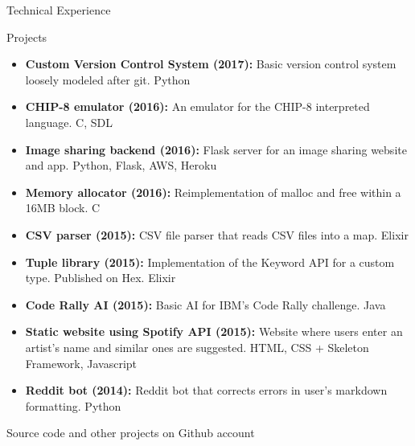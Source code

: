 \documentclass[]{mcdowellcv}
\begin{document}
	\begin{cvsection}{Technical Experience}
		\begin{cvsubsection}{Projects}{}{}
			\begin{itemize}
				\item \textbf{Custom Version Control System (2017):} Basic version control system loosely modeled after git. Python
                \item \textbf{CHIP-8 emulator (2016):} An emulator for the CHIP-8 interpreted language.  C, SDL
                \item \textbf{Image sharing backend (2016):} Flask server for an image sharing website and app.  Python, Flask, AWS, Heroku
				\item \textbf{Memory allocator (2016):} Reimplementation of malloc and free within a 16MB block.  C
				\item \textbf{CSV parser (2015):} CSV file parser that reads CSV files into a map.  Elixir
				\item \textbf{Tuple library (2015):} Implementation of the Keyword API for a custom type. Published on Hex.  Elixir
				\item \textbf{Code Rally AI (2015):} Basic AI for IBM's Code Rally challenge.  Java
				\item \textbf{Static website using Spotify API (2015):} Website where users enter an artist's name and similar ones are suggested.  HTML, CSS + Skeleton Framework, Javascript
				\item \textbf{Reddit bot (2014):} Reddit bot that corrects errors in user's markdown formatting.  Python
			\end{itemize}
            Source code and other projects on Github account
		\end{cvsubsection}
	\end{cvsection}
\end{document}
